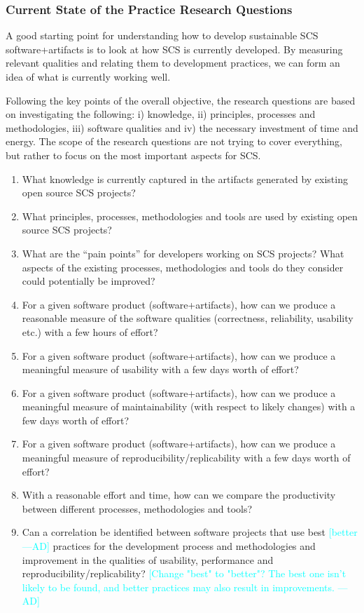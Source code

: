 \documentclass[12pt]{article}
\newcommand{\authornote}[3]{\textcolor{#1}{[#3 ---#2]}}
\newcommand{\authornote}[3]{}
\newcommand{\ad}[1]{\authornote{cyan}{AD}{#1}} %
\begin{document}
\subsubsection*{Current State of the Practice Research Questions}

A good starting point for understanding how to develop sustainable SCS software+artifacts is
to look at how SCS is currently developed.  By measuring relevant qualities and
relating them to development practices, we can form an idea of what is currently
working well.

Following the key points of the overall objective, the research questions are
based on investigating the following: i) knowledge, ii) principles, processes
and methodologies, iii) software qualities and iv) the necessary investment of
time and energy.  The scope of the research questions are not trying to cover
everything, but rather to focus on the most important aspects for SCS.

\begin{enumerate}
\item What knowledge is currently captured in the artifacts generated by
  existing open source SCS projects?
\item What principles, processes, methodologies and tools are used by existing
  open source SCS projects?
\item What are the ``pain points'' for developers working on SCS projects?  What
  aspects of the existing processes, methodologies and tools do they consider
  could potentially be improved?
\item For a given software product (software+artifacts), how can we produce a
  reasonable measure of the software qualities (correctness, reliability,
  usability etc.) with a few hours of effort?
\item For a given software product (software+artifacts), how can we produce a
  meaningful measure of usability with a few days worth of effort?
\item For a given software product (software+artifacts), how can we produce a
  meaningful measure of maintainability (with respect to likely changes) with a
  few days worth of effort?
\item For a given software product (software+artifacts), how can we produce a
  meaningful measure of reproducibility/replicability with a few days worth of
  effort?
\item With a reasonable effort and time, how can we compare the productivity
  between different processes, methodologies and tools?
\item Can a correlation be identified between software projects that use best \ad{better}
  practices for the development process and methodologies and improvement in the
  qualities of usability, performance and reproducibility/replicability?
\ad{Change "best" to "better"? The best one isn't likely to be found, and better
practices may also result in improvements.}
\end{enumerate}
\end{document}
